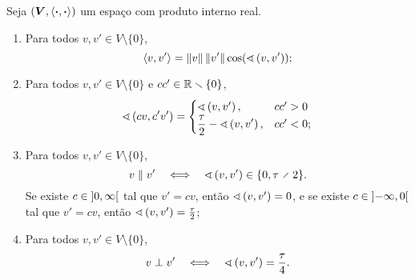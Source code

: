 \begin{proposition}
Seja $(\bm V,\left\langle{\bm{\cdot}},{\bm{\cdot}}\right\rangle)$ um espaço com produto interno real.
	\begin{enumerate}
	\item Para todos $v,v' \in V \setminus \{0\}$,
		\begin{equation*}
		\left\langle{v},{v'}\right\rangle = \left\Vert{v}\right\Vert\left\Vert{v'}\right\Vert\cos(\sphericalangle\left({v},{v'}\right));
		\end{equation*}
	\item Para todos $v,v' \in V \setminus \{0\}$ e $cc' \in \mathbb{R} \smallsetminus \{0\}$,
	\begin{equation*}
	\sphericalangle\left({cv},{c'v'}\right) = \begin{cases}
		\sphericalangle\left({v},{v'}\right),& cc'>0 \\
		\displaystyle\frac{\tau}{2} - \sphericalangle\left({v},{v'}\right),& cc'<0;
	\end{cases}
	\end{equation*}

	\item Para todos $v,v' \in V \setminus \{0\}$,
	\begin{equation*}
	v \parallel v' \sse \ang{v}{v'} \in \{0,\tau \div 2\}.
	\end{equation*}
Se existe $c \in \left]0,\allowbreak \infty\right[$ tal que $v' =cv$, então $\sphericalangle\left({v},{v'}\right) = 0$, e se existe $c \in \left]-\infty,\allowbreak 0\right[$ tal que $v' =cv$, então $\sphericalangle\left({v},{v'}\right) = \frac{\tau}{2}$;

	\item Para todos $v,v' \in V \setminus \{0\}$,
	\begin{equation*}
	v \perp  v' \quad \Longleftrightarrow \quad \sphericalangle\left({v},{v'}\right) = \frac{\tau}{4}.
	\end{equation*}
	\end{enumerate}
\end{proposition}
